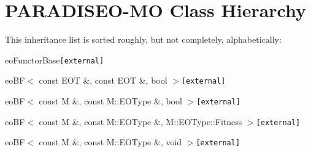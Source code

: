 \section{PARADISEO-MO Class Hierarchy}
This inheritance list is sorted roughly, but not completely, alphabetically:\begin{CompactList}
\item {}
\item eoFunctorBase{\tt  [external]}\begin{CompactList}
\item eoBF$<$ const EOT \&, const EOT \&, bool $>${\tt  [external]}\begin{CompactList}
\item {}
\begin{CompactList}
\item {}
\end{CompactList}
\end{CompactList}
\item eoBF$<$ const M \&, const M::EOType \&, bool $>${\tt  [external]}\begin{CompactList}
\item {}
\begin{CompactList}
\item {}
\item {}
\end{CompactList}
\end{CompactList}
\item eoBF$<$ const M \&, const M::EOType \&, M::EOType::Fitness $>${\tt  [external]}\begin{CompactList}
\item {}
\end{CompactList}
\item eoBF$<$ const M \&, const M::EOType \&, void $>${\tt  [external]}\begin{CompactList}
\item {}

\end{CompactList}
\end{CompactList}
\end{CompactList}
